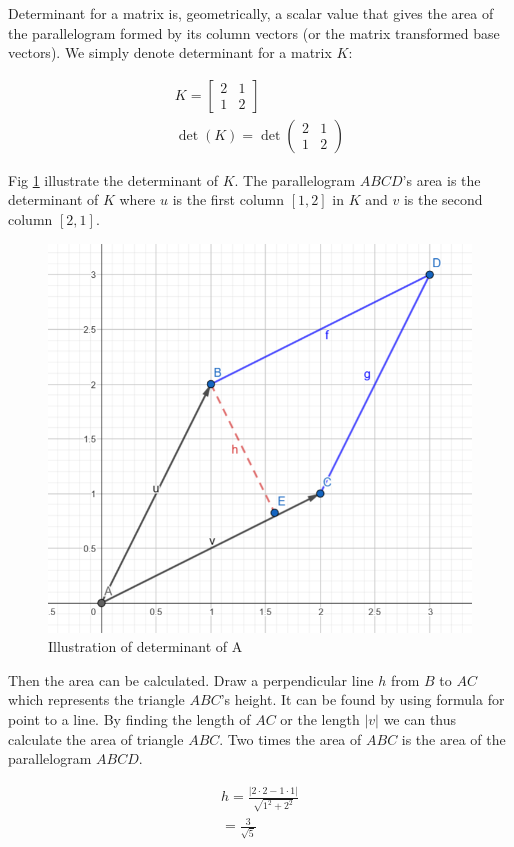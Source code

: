 \documentclass[stu,12pt,floatsintext]{apa7}
\begin{document}
Determinant for a matrix is, geometrically, a scalar value that gives the area of the parallelogram formed by its column vectors (or the matrix transformed base vectors). We simply denote determinant for a matrix $K$:

\begin{gather}
    K=\begin{bmatrix}
        2 & 1\\
        1 & 2
    \end{bmatrix}\\
    \det (K) = \det\begin{pmatrix}
        2 & 1\\
        1 & 2
    \end{pmatrix}
\end{gather}

Fig \ref{fig:determinant1} illustrate the determinant of $K$. The parallelogram $ABCD$'s area is the determinant of $K$ where $u$ is the first column $[1,2]$ in $K$ and $v$ is the second column $[2,1]$. 

\begin{figure}[h]
    \centering
    \includegraphics[width=0.7\linewidth]{images/determinant1.png}
    \caption{Illustration of determinant of A}
    \label{fig:determinant1}
\end{figure}

Then the area can be calculated. Draw a perpendicular line $h$ from $B$ to $AC$ which represents the triangle $ABC$'s height. It can be found by using formula for point to a line. By finding the length of $AC$ or the length $|v|$ we can thus calculate the area of triangle $ABC$. Two times the area of $ABC$ is the area of the parallelogram $ABCD$. 

\begin{gather}
    h=\frac{|2\cdot 2-1\cdot 1|}{\sqrt{1^2+2^2}}\\
    =\frac{3}{\sqrt{5}}
\end{gather}
\end{document}
